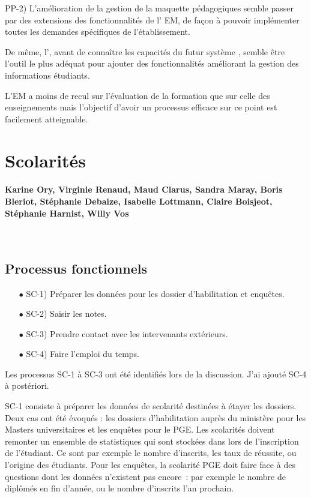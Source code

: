 \documentclass{book}
\begin{document}
PP-2) L'amélioration de la gestion de la maquette pédagogiques semble passer par
des extensions des fonctionnalités de l' EM, de façon à pouvoir
implémenter toutes les demandes spécifiques de l'établissement.

De même, l', avant de connaître les capacités du futur 
système , semble être l'outil le plus adéquat pour ajouter des 
fonctionnalités améliorant la gestion des informations étudiants.

L'EM a moins de recul sur l'évaluation de la formation que sur celle des enseignements
mais l'objectif d'avoir un processus efficace sur ce point est facilement atteignable.


 
\section{Scolarités}


\paragraph{Karine Ory, Virginie Renaud, Maud Clarus, Sandra Maray, Boris Bleriot, 
Stéphanie Debaize, Isabelle Lottmann, Claire Boisjeot, Stéphanie Harnist, Willy Vos}
~\\

\subsection{Processus fonctionnels}


\begin{itemize}
\item[$\bullet$] SC-1) Préparer les données pour les dossier d'habilitation et enquêtes.
\item[$\bullet$] SC-2) Saisir les notes.
\item[$\bullet$] SC-3) Prendre contact avec les intervenants extérieurs.
\item[$\bullet$] SC-4) Faire l'emploi du temps.
\end{itemize}

Les processus SC-1 à SC-3 ont été identifiés lors de la discussion.
J'ai ajouté SC-4 à postériori.


\bigskip 
SC-1 consiste à préparer les données de scolarité destinées à étayer les dossiers.
Deux cas ont été évoqués : les dossiers d'habilitation auprès du ministère pour les 
Masters universitaires et les enquêtes pour le PGE. Les scolarités doivent 
remonter un ensemble de statistiques qui sont stockées dans  lors
de l'inscription de l'étudiant. Ce sont par exemple le nombre d'inscrits, les 
taux de réussite, ou l'origine des étudiants. Pour les enquêtes, la scolarité
PGE doit faire face à des questions dont les données n'existent pas encore~:
par exemple le nombre de diplômés en fin d'année, ou le nombre d'inscrits
l'an prochain.\\ 
\end{document}
